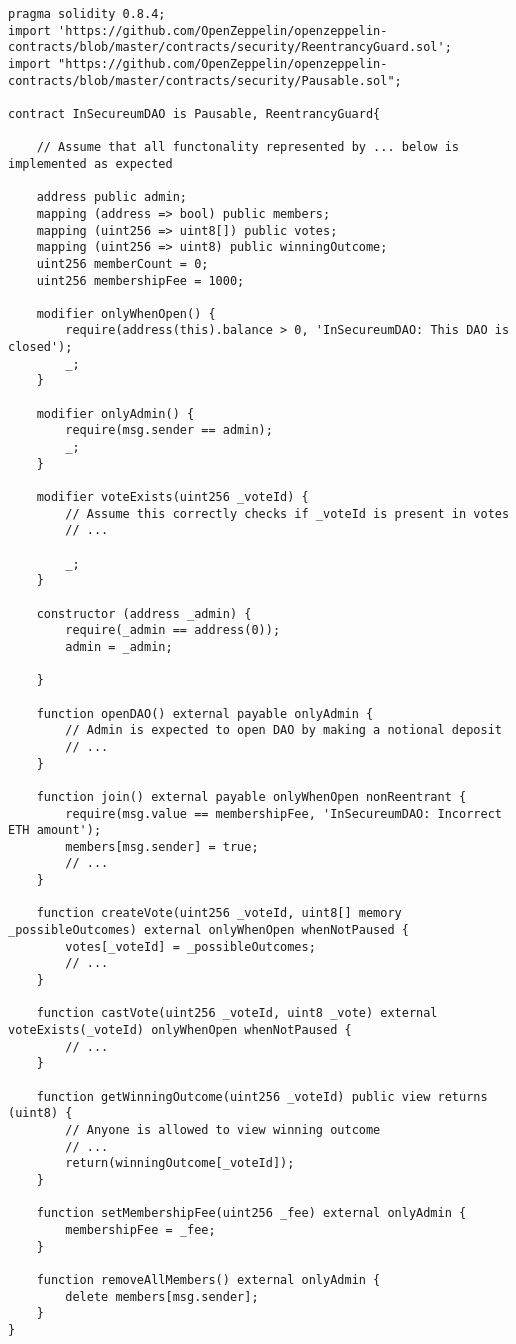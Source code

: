 \begin{lstlisting}[language=Solidity, style=solStyle]
pragma solidity 0.8.4;
import 'https://github.com/OpenZeppelin/openzeppelin-contracts/blob/master/contracts/security/ReentrancyGuard.sol';
import "https://github.com/OpenZeppelin/openzeppelin-contracts/blob/master/contracts/security/Pausable.sol";

contract InSecureumDAO is Pausable, ReentrancyGuard{

    // Assume that all functonality represented by ... below is implemented as expected
    
    address public admin;
    mapping (address => bool) public members;
    mapping (uint256 => uint8[]) public votes;
    mapping (uint256 => uint8) public winningOutcome;
    uint256 memberCount = 0;
    uint256 membershipFee = 1000;

    modifier onlyWhenOpen() {
        require(address(this).balance > 0, 'InSecureumDAO: This DAO is closed');
        _;
    }

    modifier onlyAdmin() {
        require(msg.sender == admin);
        _;
    }
    
    modifier voteExists(uint256 _voteId) {
        // Assume this correctly checks if _voteId is present in votes
        // ...
        
        _;
    }
    
    constructor (address _admin) {
        require(_admin == address(0));
        admin = _admin;
    
    }
    
    function openDAO() external payable onlyAdmin {
        // Admin is expected to open DAO by making a notional deposit
        // ...
    }
    
    function join() external payable onlyWhenOpen nonReentrant {
        require(msg.value == membershipFee, 'InSecureumDAO: Incorrect ETH amount');
        members[msg.sender] = true;
        // ...
    }
    
    function createVote(uint256 _voteId, uint8[] memory _possibleOutcomes) external onlyWhenOpen whenNotPaused {
        votes[_voteId] = _possibleOutcomes;
        // ...
    }
    
    function castVote(uint256 _voteId, uint8 _vote) external voteExists(_voteId) onlyWhenOpen whenNotPaused {
        // ...
    }
    
    function getWinningOutcome(uint256 _voteId) public view returns (uint8) {
        // Anyone is allowed to view winning outcome
        // ...
        return(winningOutcome[_voteId]);
    }
    
    function setMembershipFee(uint256 _fee) external onlyAdmin {
        membershipFee = _fee;
    }
    
    function removeAllMembers() external onlyAdmin {
        delete members[msg.sender];
    }
}
\end{lstlisting}

